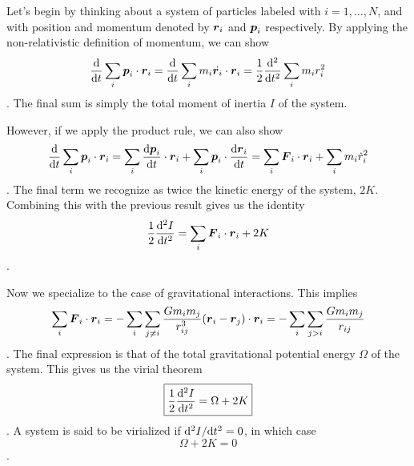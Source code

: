 Let's begin by thinking about a system of particles labeled with $i=1,\ldots,N$, and with
position and momentum denoted by $\boldsymbol r_i$ and $\boldsymbol p_i$ respectively.  By applying the non-relativistic
definition of momentum, we can show
\begin{dmath*}
    \frac{\d}{\d t}\sum_i \b p_i\cdot\b r_i
        = \frac{\d}{\d t}\sum_i m_i\dot{\b r_i}\cdot\b r_i
        = \frac{1}{2}\frac{\d^2}{\d t^2}\sum_i m_i r_i^2
\end{dmath*}.
The final sum is simply the total moment of inertia $I$ of the system.

However, if we apply the product rule, we can also show
\begin{dmath*}
    \frac{\d}{\d t}\sum_i \b p_i\cdot\b r_i
        = \sum_i \frac{\d\b p_i}{\d t}\cdot\b r_i
            +\sum_i \b p_i\cdot\frac{\d\b r_i}{\d t}
        = \sum_i \b F_i\cdot\b r_i
            +\sum_i m_i{\dot r_i}^2
\end{dmath*}.
The final term we recognize as twice the kinetic energy of the system, $2K$.
Combining this with the previous result gives us the identity
\begin{dmath}
    \frac{1}{2}\frac{\d^2I}{\d t^2}
        = \sum_i \b F_i\cdot\b r_i+2K
\end{dmath}.

Now we specialize to the case of gravitational interactions.  This implies
\begin{dmath*}
    \sum_i \b F_i\cdot\b r_i
        = -\sum_i\sum_{j\neq i} \frac{Gm_im_j}{r_{ij}^3}(\b r_i-\b r_j)\cdot \b r_i
        = -\sum_i\sum_{j > i} \frac{Gm_im_j}{r_{ij}}
\end{dmath*}.
The final expression is that of the total gravitational potential energy $\Omega$
of the system.  This gives us the virial theorem
\begin{dmath}\boxed{
    \frac{1}{2}\frac{\d^2I}{\d t^2}
        = \Omega+2K
}\end{dmath}.
A system is said to be virialized if ${\rm d}^2I/{\rm d} t^2=0$, in which case
\begin{dmath}\boxed{
    \Omega+2K = 0
}\end{dmath}.

